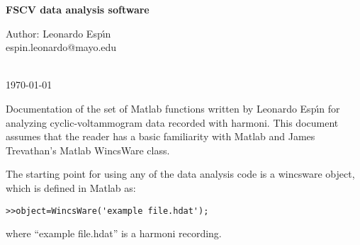 \documentclass{article}
\begin{document}
\begin{flushleft}
{\large\bf  FSCV data analysis software}\hfill \begin{minipage}{0.25\textwidth}Author: Leonardo Esp\'\i n\\
espin.leonardo@mayo.edu\end{minipage}\\
\today
\end{flushleft}
Documentation of the set of Matlab functions written by Leonardo Esp\'\i n for analyzing cyclic-voltammogram data recorded with harmoni. This document assumes that the reader has a basic familiarity with Matlab and James Trevathan's Matlab WincsWare class.

The starting point for using any of the data analysis code is a wincsware object, which is defined in Matlab as:

\noindent\verb|>>object=WincsWare('example file.hdat');|

\noindent where ``example file.hdat'' is a harmoni recording. 
\end{document}
